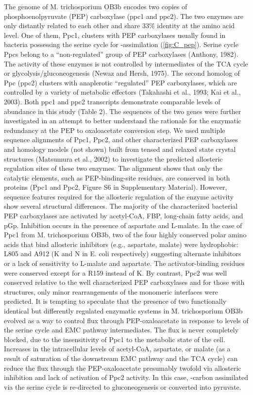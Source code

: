 The genome of M. trichosporium OB3b encodes two copies of phosphoenolpyruvate (PEP) carboxylase (ppc1 and ppc2).
The two enzymes are only distantly related to each other and share 33\% identity at the amino acid level.
One of them, Ppc1, clusters with PEP carboxylases usually found in bacteria possessing the serine cycle for -assimilation (\ref{fig:C_pep}).
Serine cycle Ppcs belong to a “non-regulated” group of PEP carboxylases (Anthony, 1982).
The activity of these enzymes is not controlled by intermediates of the TCA cycle or glycolysis/gluconeogenesis (Newaz and Hersh, 1975).
The second homolog of Ppc (ppc2) clusters with anaplerotic “regulated” PEP carboxylases, which are controlled by a variety of metabolic effectors (Takahashi et al., 1993; Kai et al., 2003).
Both ppc1 and ppc2 transcripts demonstrate comparable levels of abundance in this study (Table 2).
The sequences of the two genes were further investigated in an attempt to better understand the rationale for the enzymatic redundancy at the PEP to oxaloacetate conversion step.
We used multiple sequence alignments of Ppc1, Ppc2, and other characterized PEP carboxylases and homology models (not shown) built from tensed and relaxed state crystal structures (Matsumura et al., 2002) to investigate the predicted allosteric regulation sites of these two enzymes.
The alignment shows that only the catalytic elements, such as PEP-binding-site residues, are conserved in both proteins (Ppc1 and Ppc2, Figure S6 in Supplementary Material).
However, sequence features required for the allosteric regulation of the enzyme activity show several structural differences.
The majority of the characterized bacterial PEP carboxylases are activated by acetyl-CoA, FBP, long-chain fatty acids, and pGp.
Inhibition occurs in the presence of aspartate and L-malate.
In the case of Ppc1 from M. trichosporium OB3b, two of the four highly conserved polar amino acids that bind allosteric inhibitors (e.g., aspartate, malate) were hydrophobic: L805 and A912 (K and N in E. coli respectively) suggesting alternate inhibitors or a lack of sensitivity to L-malate and aspartate.
The activator-binding residues were conserved except for a R159 instead of K.
By contrast, Ppc2 was well conserved relative to the well characterized PEP carboxylases and for those with structures, only minor rearrangements of the monomeric interfaces were predicted.
It is tempting to speculate that the presence of two functionally identical but differently regulated enzymatic systems in M. trichosporium OB3b evolved as a way to control flux through PEP-oxaloacetate in response to levels of the serine cycle and EMC pathway intermediates.
The flux is never completely blocked, due to the insensitivity of Ppc1 to the metabolic state of the cell.
Increases in the intracellular levels of acetyl-CoA, aspartate, or malate (as a result of saturation of the downstream EMC pathway and the TCA cycle) can reduce the flux through the PEP-oxaloacetate presumably twofold via allosteric inhibition and lack of activation of Ppc2 activity.
In this case, -carbon assimilated via the serine cycle is re-directed to gluconeogenesis or converted into pyruvate.

